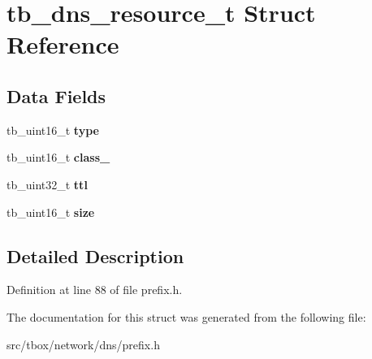 \hypertarget{structtb__dns__resource__t}{\section{tb\-\_\-dns\-\_\-resource\-\_\-t Struct Reference}
\label{structtb__dns__resource__t}
}
\subsection*{Data Fields}
\begin{DoxyCompactItemize}
\item 
\hypertarget{structtb__dns__resource__t_a5945d4098c8601e4098287d10f70dd94}{tb\-\_\-uint16\-\_\-t {\bfseries type}}\label{structtb__dns__resource__t_a5945d4098c8601e4098287d10f70dd94}

\item 
\hypertarget{structtb__dns__resource__t_a2b709ee5663ab620cdc03163da5698a9}{tb\-\_\-uint16\-\_\-t {\bfseries class\-\_\-}}\label{structtb__dns__resource__t_a2b709ee5663ab620cdc03163da5698a9}

\item 
\hypertarget{structtb__dns__resource__t_a26f1c67ea2d94fdbb30f39f9be64f973}{tb\-\_\-uint32\-\_\-t {\bfseries ttl}}\label{structtb__dns__resource__t_a26f1c67ea2d94fdbb30f39f9be64f973}

\item 
\hypertarget{structtb__dns__resource__t_a4285478b142ce7ade97988fee208a09f}{tb\-\_\-uint16\-\_\-t {\bfseries size}}\label{structtb__dns__resource__t_a4285478b142ce7ade97988fee208a09f}

\end{DoxyCompactItemize}


\subsection{Detailed Description}


Definition at line 88 of file prefix.\-h.



The documentation for this struct was generated from the following file\-:\begin{DoxyCompactItemize}
\item 
src/tbox/network/dns/prefix.\-h\end{DoxyCompactItemize}
